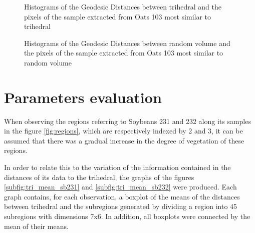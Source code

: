 \documentclass[12pt]{article}
\begin{document}
\begin{figure*}[hbt]
\centering
{}
\caption{Histograms of the Geodesic Distances between trihedral and the pixels of the sample extracted from Oats 103 most similar to trihedral}
\label{fig:ot103_hist_tri}
\end{figure*}

\begin{figure*}[hbt]
\centering
{}
\caption{Histograms of the Geodesic Distances between random volume and the pixels of the sample extracted from Oats 103 most similar to random volume}
\label{fig:ot103_hist_rv}
\end{figure*}

\section{Parameters evaluation}
When observing the regions referring to Soybeans 231 and 232 along its samples in the figure \ref{fig:regions}, which are respectively indexed by 2 and 3, it can be assumed that there was a gradual increase in the degree of vegetation of these regions.

In order to relate this to the variation of the information contained in the distances of its data to the trihedral, the graphs of the figures \ref{subfig:tri_mean_sb231} and \ref{subfig:tri_mean_sb232} were produced. Each graph contains, for each observation, a boxplot of the means of the distances between trihedral and the subregions generated by dividing a region into 45 subregions with dimensions 7x6. In addition, all boxplots were connected by the mean of their means.
\end{document}

